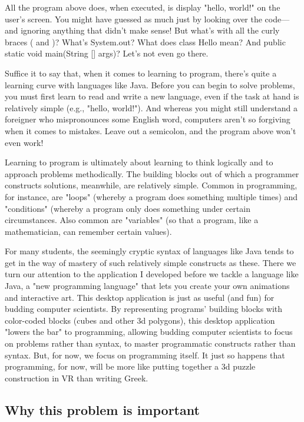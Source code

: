 All the program above does, when executed, is display "hello, world!" on the user's screen. You might have guessed as much just by looking over the code—and ignoring anything that didn't make sense! But what's with all the curly braces ({ and })? What's System.out? What does class Hello mean? And public static void main(String [] args)? Let's not even go there. 

Suffice it to say that, when it comes to learning to program, there's quite a learning curve with languages like Java. Before you can begin to solve problems, you must first learn to read and write a new language, even if the task at hand is relatively simple (e.g., "hello, world!"). And whereas you might still understand a foreigner who mispronounces some English word, computers aren't so forgiving when it comes to mistakes. Leave out a semicolon, and the program above won't even work! 

Learning to program is ultimately about learning to think logically and to approach problems methodically. The building blocks out of which a programmer constructs solutions, meanwhile, are relatively simple. Common in programming, for instance, are "loops" (whereby a program does something multiple times) and "conditions" (whereby a program only does something under certain circumstances. Also common are "variables" (so that a program, like a mathematician, can remember certain values). 

For many students, the seemingly cryptic syntax of languages like Java tends to get in the way of mastery of such relatively simple constructs as these. There we turn our attention to the application I developed before we tackle a language like Java, a "new programming language" that lets you create your own animations and interactive art. This desktop application is just as useful (and fun) for budding computer scientists. By representing programs' building blocks with color-coded blocks (cubes and other 3d polygons), this desktop application "lowers the bar" to programming, allowing budding computer scientists to focus on problems rather than syntax, to master programmatic constructs rather than syntax. But, for now, we focus on programming itself. It just so happens that programming, for now, will be more like putting together a 3d puzzle construction in VR than writing Greek. 

\subsection{Why this problem is important}

